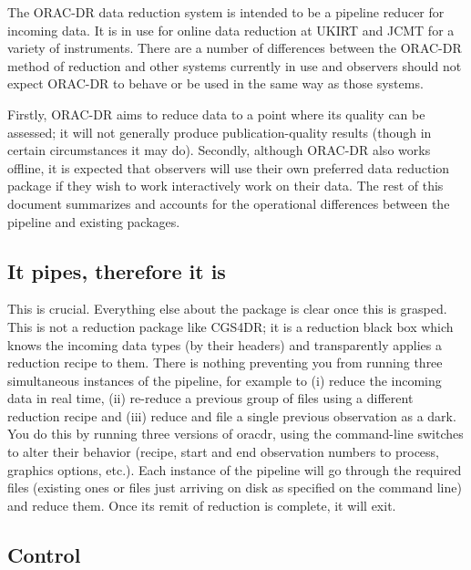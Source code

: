 \documentclass[twoside,11pt]{article}
\renewcommand{\_}{\texttt{\symbol{95}}}
\begin{document}
The ORAC-DR data reduction system is intended to be a pipeline reducer
for incoming data. It is in use for online data reduction at UKIRT and
JCMT for a variety of instruments. There are a number of differences
between the ORAC-DR method of reduction and other systems currently in
use and observers should not expect ORAC-DR to behave or be used in
the same way as those systems.



Firstly, ORAC-DR aims to reduce data to a point where its quality can
be assessed; it will not generally produce publication-quality results
(though in certain circumstances it may do).  Secondly, although
ORAC-DR also works offline, it is expected that observers will use
their own preferred data reduction package if they wish to work
interactively work on their data. The rest of this document summarizes
and accounts for the operational differences between the pipeline and
existing packages.

\subsection*{It pipes, therefore it is\label{Introduction_to_ORAC-DR_It_pipes_therefore_it_is}}


This is crucial. Everything else about the package is clear once this
is grasped. This is not a reduction package like CGS4DR; it is a
reduction black box which knows the incoming data types (by their
headers) and transparently applies a reduction recipe to them. There
is nothing preventing you from running three simultaneous instances of
the pipeline, for example to (i) reduce the incoming data in real
time, (ii) re-reduce a previous group of files using a different
reduction recipe and (iii) reduce and file a single previous
observation as a dark. You do this by running three versions of
oracdr, using the command-line switches to alter their behavior
(recipe, start and end observation numbers to process, graphics
options, etc.). Each instance of the pipeline will go through the
required files (existing ones or files just arriving on disk as
specified on the command line) and reduce them. Once its remit of
reduction is complete, it will exit.

\subsection*{Control\label{Introduction_to_ORAC-DR_Control}}
\end{document}
